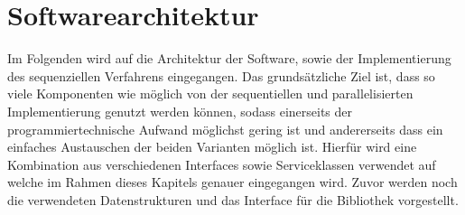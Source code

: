 \section{Softwarearchitektur}
Im Folgenden wird auf die Architektur der Software, sowie der Implementierung des sequenziellen Verfahrens eingegangen. Das grundsätzliche Ziel ist, dass so viele Komponenten wie möglich von der sequentiellen und parallelisierten Implementierung genutzt werden können, sodass einerseits der programmiertechnische Aufwand möglichst gering ist und andererseits dass ein einfaches Austauschen der beiden Varianten möglich ist. Hierfür wird eine Kombination aus verschiedenen Interfaces sowie Serviceklassen verwendet auf welche  im Rahmen dieses Kapitels genauer eingegangen wird. Zuvor werden noch die verwendeten Datenstrukturen und das Interface für die Bibliothek vorgestellt.
 
